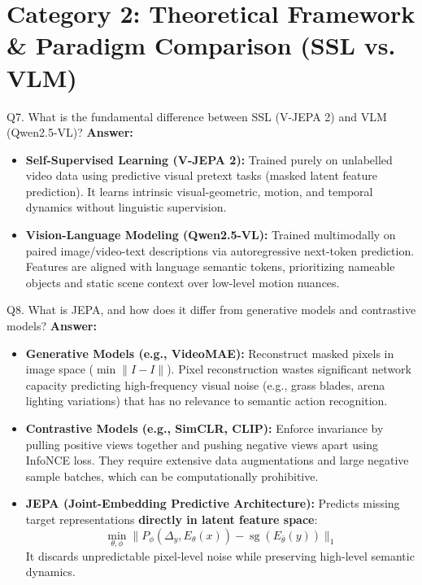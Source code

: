 \documentclass[a4paper, 11pt]{article}
\begin{document}
\newpage
\section{Category 2: Theoretical Framework \& Paradigm Comparison (SSL vs. VLM)}

\begin{questionbox}{Q7. What is the fundamental difference between SSL (V-JEPA 2) and VLM (Qwen2.5-VL)?}
\textbf{Answer:}
\begin{itemize}
    \item \textbf{Self-Supervised Learning (V-JEPA 2):} Trained purely on unlabelled video data using predictive visual pretext tasks (masked latent feature prediction). It learns intrinsic visual-geometric, motion, and temporal dynamics without linguistic supervision.
    \item \textbf{Vision-Language Modeling (Qwen2.5-VL):} Trained multimodally on paired image/video-text descriptions via autoregressive next-token prediction. Features are aligned with language semantic tokens, prioritizing nameable objects and static scene context over low-level motion nuances.
\end{itemize}
\end{questionbox}

\begin{questionbox}{Q8. What is JEPA, and how does it differ from generative models and contrastive models?}
\textbf{Answer:}
\begin{itemize}
    \item \textbf{Generative Models (e.g., VideoMAE):} Reconstruct masked pixels in image space ($\min \| \hat{I} - I \|$). Pixel reconstruction wastes significant network capacity predicting high-frequency visual noise (e.g., grass blades, arena lighting variations) that has no relevance to semantic action recognition.
    \item \textbf{Contrastive Models (e.g., SimCLR, CLIP):} Enforce invariance by pulling positive views together and pushing negative views apart using InfoNCE loss. They require extensive data augmentations and large negative sample batches, which can be computationally prohibitive.
    \item \textbf{JEPA (Joint-Embedding Predictive Architecture):} Predicts missing target representations \textbf{directly in latent feature space}:
    \[
    \min_{\theta, \phi} \| P_\phi(\Delta_y, E_\theta(x)) - \operatorname{sg}(E_{\bar{\theta}}(y)) \|_1
    \]
    It discards unpredictable pixel-level noise while preserving high-level semantic dynamics.
\end{itemize}
\end{questionbox}
\end{document}
